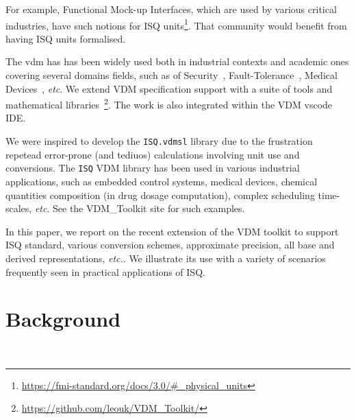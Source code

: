 \documentclass[runningheads,a4paper]{llncs}
\begin{document}
For example, Functional Mock-up Interfaces, which are used by various critical industries, have such notions for ISQ units\footnote{\url{https://fmi-standard.org/docs/3.0/\#_physical_units}}. That community would benefit from having ISQ units formalised.         

The \gls{vdm} has has been widely used both in industrial contexts and academic ones covering several domains fields, such as of Security~\cite{Kulik&20,Kulik&21a}, Fault-Tolerance~\cite{Nilsson&18}, Medical Devices~\cite{Macedo&08}, \textit{etc}. We extend VDM specification support with a suite of tools and mathematical libraries~\footnote{\url{https://github.com/leouk/VDM_Toolkit/}}. The work is also integrated within the VDM \gls{vscode} IDE.

We were inspired to develop the \texttt{ISQ.vdmsl} library due to the frustration repetead error-prone (and tediuos) calculations involving unit use and conversions. The \texttt{ISQ} VDM library has been used in various industrial applications, such as embedded control systems, medical devices, chemical quantities composition (in drug dosage computation), complex scheduling time-scales, \textit{etc}. See the VDM\_Toolkit site for such examples.     

In this paper, we report on the recent extension of the VDM toolkit to support ISQ standard, various conversion schemes, approximate precision, all base and derived representations, \textit{etc.}. We illustrate its use with a variety of scenarios frequently seen in practical applications of ISQ\@.    

\section{Background}~\label{sec:background}
\end{document}
